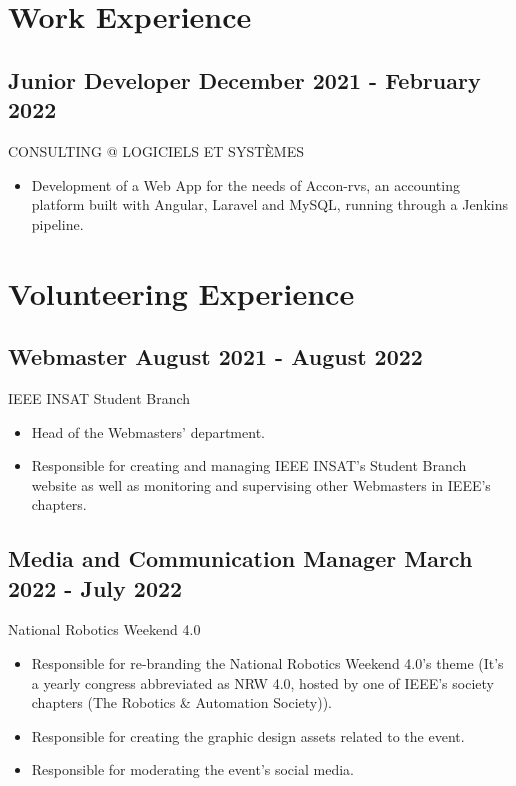 \documentclass[a4,10pt]{article}
\newcommand{\subtext}[1]{
#1\par\vspace{-0.2cm}}
\newenvironment{zitemize}{
\begin{itemize}\itemsep0pt \parskip0pt \parsep1pt}
{\end{itemize}\vspace{-0.5cm}}
\begin{document}
\section{Work Experience}
\subsection*{ Junior Developer \hfill December 2021 - February 2022} 
\subtext{CONSULTING @ LOGICIELS ET SYSTÈMES\hfill } 
    \begin{zitemize}
        \item  Development of a Web App for the needs of Accon-rvs, an accounting platform built with Angular, Laravel and MySQL, running through a Jenkins pipeline.
    \end{zitemize}
    


\section{Volunteering Experience}

\subsection*{Webmaster \hfill August 2021 - August 2022} 
\subtext{IEEE INSAT Student Branch\hfill } 
    \begin{zitemize}
        \item   Head of the Webmasters' department.
        \item  Responsible for creating and managing IEEE INSAT's Student Branch website as well as monitoring and supervising other Webmasters in IEEE's chapters.
                        

    \end{zitemize}
    
\subsection*{Media and Communication Manager \hfill March 2022 - July 2022} 
\subtext{National Robotics Weekend 4.0\hfill } 
    \begin{zitemize}
        \item Responsible for re-branding the National Robotics Weekend 4.0's theme (It's a yearly congress abbreviated as NRW 4.0, hosted by one of IEEE's society chapters (The Robotics & Automation Society)).
        \item Responsible for creating the graphic design assets related to the event.
        \item Responsible for moderating the event's social media.
    \end{zitemize}
\end{document}
